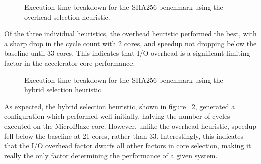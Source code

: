 \documentclass{UoYCSproject}
\begin{document}
\begin{figure}[H]
\caption{Execution-time breakdown for the SHA256 benchmark using the overhead selection heuristic.}
\label{fig:breakdownOverheadSHA256}
\end{figure}

Of the three individual heuristics, the overhead heuristic performed the best, with a sharp drop in the cycle count
with 2 cores, and speedup not dropping below the baseline until 33 cores. This indicates that I/O overhead is a significant
limiting factor in the accelerator core performance.

\begin{figure}[H]
\caption{Execution-time breakdown for the SHA256 benchmark using the hybrid selection heuristic.}
\label{fig:breakdownHybridSHA256}
\end{figure}

As expected, the hybrid selection heuristic, shown in figure ~\ref{fig:breakdownHybridSHA256}, generated
a configuration which performed well initially, halving the number of cycles executed on the MicroBlaze core.
However, unlike the overhead heuristic, speedup fell below the baseline at 21 cores, rather than 33.
Interestingly, this indicates that the I/O overhead factor dwarfs all other factors in core selection, making
it really the only factor determining the performance of a given system.
\end{document}
